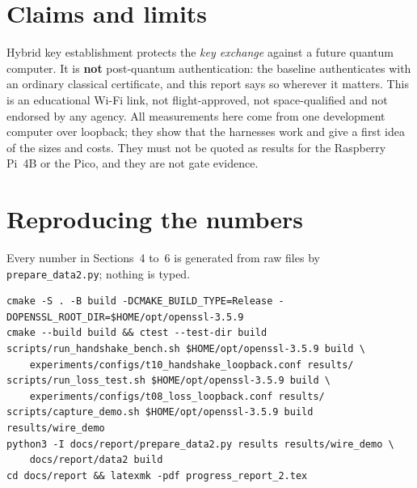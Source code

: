 \documentclass[11pt,a4paper]{article}
\newcommand{\prog}[1]{\texttt{#1}}
\begin{document}
\FloatBarrier
\section{Claims and limits}

Hybrid key establishment protects the \emph{key exchange} against a future quantum computer. It is
\textbf{not} post-quantum authentication: the baseline authenticates with an ordinary classical certificate,
and this report says so wherever it matters. This is an educational Wi-Fi link, not flight-approved, not
space-qualified and not endorsed by any agency. All measurements here come from one development computer
over loopback; they show that the harnesses work and give a first idea of the sizes and costs. They must not
be quoted as results for the Raspberry Pi~4B or the Pico, and they are not gate evidence.

\appendix
\section{Reproducing the numbers}

Every number in Sections~4 to~6 is generated from raw files by \prog{prepare\_data2.py}; nothing is typed.

\begin{small}
\begin{verbatim}
cmake -S . -B build -DCMAKE_BUILD_TYPE=Release -DOPENSSL_ROOT_DIR=$HOME/opt/openssl-3.5.9
cmake --build build && ctest --test-dir build
scripts/run_handshake_bench.sh $HOME/opt/openssl-3.5.9 build \
    experiments/configs/t10_handshake_loopback.conf results/
scripts/run_loss_test.sh $HOME/opt/openssl-3.5.9 build \
    experiments/configs/t08_loss_loopback.conf results/
scripts/capture_demo.sh $HOME/opt/openssl-3.5.9 build results/wire_demo
python3 -I docs/report/prepare_data2.py results results/wire_demo \
    docs/report/data2 build
cd docs/report && latexmk -pdf progress_report_2.tex
\end{verbatim}
\end{small}
\end{document}
